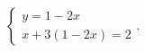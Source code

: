 $\displaystyle
\left\{
\begin{array}{l}
\displaystyle y = 1 - 2x \\
\displaystyle x + 3(1 - 2x) = 2
\end{array}
\right.
$.
